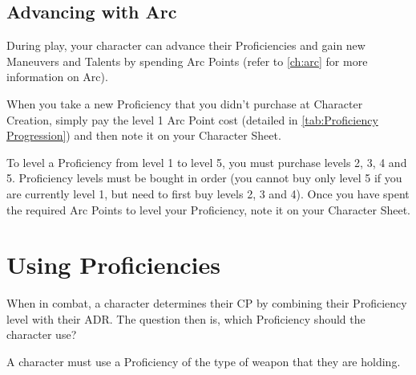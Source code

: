 \documentclass[oneside,11pt,english]{book}
\begin{document}
\subsection{Advancing with Arc}

During play, your character can advance their Proficiencies and gain new
Maneuvers and Talents by spending Arc Points (refer to \autoref{ch:arc} for more
information on Arc). 

When you take a new Proficiency that you didn’t purchase at Character Creation,
simply pay the level 1 Arc Point cost (detailed in \autoref{tab:Proficiency
  Progression}) and then note it on your Character Sheet. 

To level a Proficiency from level 1 to level 5, you must purchase levels 2, 3, 4
and 5. Proficiency levels must be bought in order (you cannot buy only level 5
if you are currently level 1, but need to first buy levels 2, 3 and 4). Once you
have spent the required Arc Points to level your Proficiency, note it on your
Character Sheet.  

\section{Using Proficiencies}
When in combat, a character determines their CP by combining their Proficiency
level with their ADR. The question then is, which Proficiency should the
character use?

A character must use a Proficiency of the type of weapon that they are holding.
\end{document}
